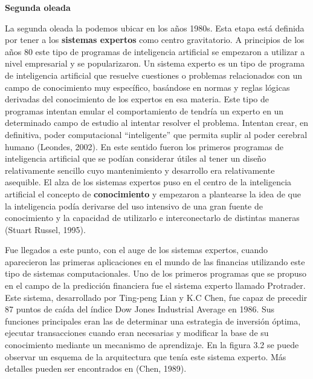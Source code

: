 \documentclass[]{DissertateUSU}
\begin{document}
\textbf{Segunda oleada}

\noindent La segunda oleada la podemos ubicar en los años 1980s. Esta
etapa está definida por tener a los \textbf{sistemas expertos} como
centro gravitatorio. A principios de los años 80 este tipo de programas
de inteligencia artificial se empezaron a utilizar a nivel empresarial y
se popularizaron. Un sistema experto es un tipo de programa de
inteligencia artificial que resuelve cuestiones o problemas relacionados
con un campo de conocimiento muy específico, basándose en normas y
reglas lógicas derivadas del conocimiento de los expertos en esa
materia. Este tipo de programas intentan emular el comportamiento de
tendría un experto en un determinado campo de estudio al intentar
resolver el problema. Intentan crear, en definitiva, poder computacional
``inteligente'' que permita suplir al poder cerebral humano (Leondes,
2002). En este sentido fueron los primeros programas de inteligencia
artificial que se podían considerar útiles al tener un diseño
relativamente sencillo cuyo mantenimiento y desarrollo era relativamente
asequible. El alza de los sistemas expertos puso en el centro de la
inteligencia artificial el concepto de \textbf{conocimiento} y empezaron
a plantearse la idea de que la inteligencia podía derivarse del uso
intensivo de una gran fuente de conocimiento y la capacidad de
utilizarlo e interconectarlo de distintas maneras (Stuart Russel, 1995).

\noindent Fue llegados a este punto, con el auge de los sistemas
expertos, cuando aparecieron las primeras aplicaciones en el mundo de
las financias utilizando este tipo de sistemas computacionales. Uno de
los primeros programas que se propuso en el campo de la predicción
financiera fue el sistema experto llamado Protrader. Este sistema,
desarrollado por Ting-peng Lian y K.C Chen, fue capaz de precedir 87
puntos de caída del índice Dow Jones Industrial Average en 1986. Sus
funciones principales eran las de determinar una estrategia de inversión
óptima, ejecutar transacciones cuando eran necesarias y modificar la
base de su conocimiento mediante un mecanismo de aprendizaje. En la
figura 3.2 se puede observar un esquema de la arquitectura que tenía
este sistema experto. Más detalles pueden ser encontrados en (Chen,
1989).

\centering
\end{document}
